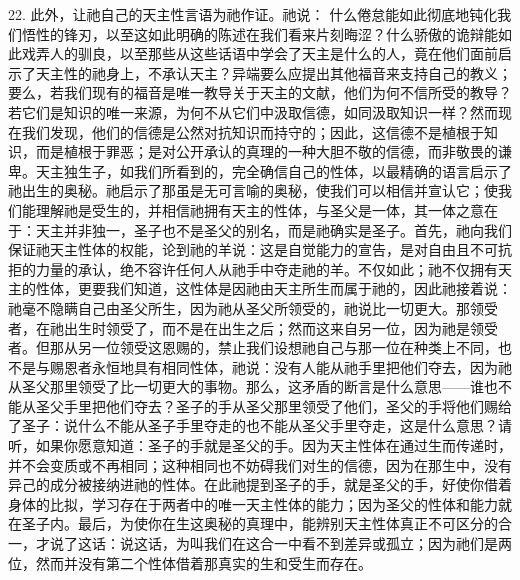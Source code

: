 22. 此外，让祂自己的天主性言语为祂作证。祂说： 什么倦怠能如此彻底地钝化我们悟性的锋刃，以至这如此明确的陈述在我们看来片刻晦涩？什么骄傲的诡辩能如此戏弄人的驯良，以至那些从这些话语中学会了天主是什么的人，竟在他们面前启示了天主性的祂身上，不承认天主？异端要么应提出其他福音来支持自己的教义；要么，若我们现有的福音是唯一教导关于天主的文献，他们为何不信所受的教导？若它们是知识的唯一来源，为何不从它们中汲取信德，如同汲取知识一样？然而现在我们发现，他们的信德是公然对抗知识而持守的；因此，这信德不是植根于知识，而是植根于罪恶；是对公开承认的真理的一种大胆不敬的信德，而非敬畏的谦卑。天主独生子，如我们所看到的，完全确信自己的性体，以最精确的语言启示了祂出生的奥秘。祂启示了那虽是无可言喻的奥秘，使我们可以相信并宣认它；使我们能理解祂是受生的，并相信祂拥有天主的性体，与圣父是一体，其一体之意在于：天主并非独一，圣子也不是圣父的别名，而是祂确实是圣子。首先，祂向我们保证祂天主性体的权能，论到祂的羊说：这是自觉能力的宣告，是对自由且不可抗拒的力量的承认，绝不容许任何人从祂手中夺走祂的羊。不仅如此；祂不仅拥有天主的性体，更要我们知道，这性体是因祂由天主所生而属于祂的，因此祂接着说：祂毫不隐瞒自己由圣父所生，因为祂从圣父所领受的，祂说比一切更大。那领受者，在祂出生时领受了，而不是在出生之后；然而这来自另一位，因为祂是领受者。但那从另一位领受这恩赐的，禁止我们设想祂自己与那一位在种类上不同，也不是与赐恩者永恒地具有相同性体，祂说：没有人能从祂手里把他们夺去，因为祂从圣父那里领受了比一切更大的事物。那么，这矛盾的断言是什么意思——谁也不能从圣父手里把他们夺去？圣子的手从圣父那里领受了他们，圣父的手将他们赐给了圣子：说什么不能从圣子手里夺走的也不能从圣父手里夺走，这是什么意思？请听，如果你愿意知道：圣子的手就是圣父的手。因为天主性体在通过生而传递时，并不会变质或不再相同；这种相同也不妨碍我们对生的信德，因为在那生中，没有异己的成分被接纳进祂的性体。在此祂提到圣子的手，就是圣父的手，好使你借着身体的比拟，学习存在于两者中的唯一天主性体的能力；因为圣父的性体和能力就在圣子内。最后，为使你在生这奥秘的真理中，能辨别天主性体真正不可区分的合一，才说了这话：说这话，为叫我们在这合一中看不到差异或孤立；因为祂们是两位，然而并没有第二个性体借着那真实的生和受生而存在。\par

